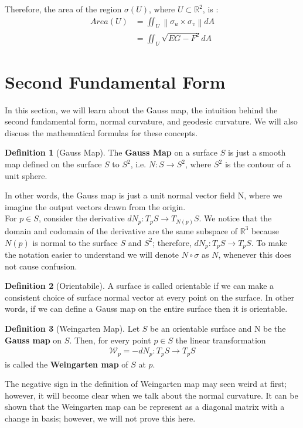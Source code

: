 \documentclass{article}
\theoremstyle{plain}
\theoremstyle{definition}
\newtheorem{definition}{Definition}
\theoremstyle{remark}
\newcommand{\R}{\mathbb{R}}
\begin{document}
Therefore, the area of the region \( \sigma(U) \), where \( U \subset \R^2 \), is :
\begin{align*}
    Area(U) & = \iint_U \left\lVert \sigma_u \times \sigma_v \right\rVert dA \\
            & = \iint_U \sqrt{EG - F^2} dA
\end{align*}

\section{Second Fundamental Form}
In this section, we will learn about the Gauss map, the intuition behind the second fundamental form, normal curvature, and geodesic curvature. We will also discuss the mathematical formulas for these concepts.

\begin{definition}[Gauss Map]
    The \textbf{Gauss Map} on a surface \(S\) is just a smooth map defined on the surface \(S\) to \(S^2\), i.e. \( N: S \rightarrow S^2 \), where \( S^2\) is the contour of a unit sphere.
\end{definition}
In other words, the Gauss map is just a unit normal vector field N, where we imagine the output vectors drawn from the origin.\\
For \( p \in S\), consider the derivative \(dN_p: T_pS \rightarrow T_{N(p)}S \). We notice that the domain and codomain of the derivative are the same subspace of \( \R^3\) because \(N(p)\) is normal to the surface \(S\) and \(S^2\); therefore, \(dN_p: T_pS \rightarrow T_pS  \). To make the notation easier to understand we will denote \(N \circ \sigma\) as \(N\), whenever this does not cause confusion.

\begin{definition}[Orientabile]
    A surface is called orientable if we can make a consistent choice of surface normal vector at every point on the surface. In other words, if we can define a Gauss map on the entire surface then it is orientable.
\end{definition}
\begin{definition}[Weingarten Map]
    Let \(S\) be an orientable surface and N be the \textbf{Gauss map} on \(S\). Then, for every point \(p \in S \) the linear transformation
    \begin{align*}
        \mathcal{W}_p = -dN_p: T_pS \rightarrow T_pS
    \end{align*}
    is called the \textbf{Weingarten map} of \(S\) at \(p\).
\end{definition}
The negative sign in the definition of Weingarten map may seen weird at first; however, it will become clear when we talk about the normal curvature. It can be shown that the Weingarten map can be represent as a diagonal matrix with a change in basis; however, we will not prove this here.
\end{document}
